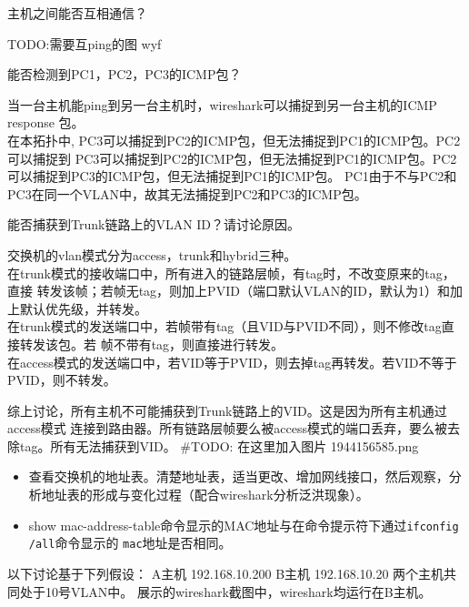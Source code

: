 \documentclass{myreport}
\begin{document}
\begin{tcolorbox}[title = {观察一}]
主机之间能否互相通信？
\end{tcolorbox}
TODO:需要互ping的图
wyf
\begin{tcolorbox}[title = {观察二}]
    能否检测到PC1，PC2，PC3的ICMP包？
\end{tcolorbox}
当一台主机能ping到另一台主机时，wireshark可以捕捉到另一台主机的ICMP response 包。\\ 
在本拓扑中, PC3可以捕捉到PC2的ICMP包，但无法捕捉到PC1的ICMP包。PC2可以捕捉到
PC3可以捕捉到PC2的ICMP包，但无法捕捉到PC1的ICMP包。PC2可以捕捉到PC3的ICMP包，但无法捕捉到PC1的ICMP包。
PC1由于不与PC2和PC3在同一个VLAN中，故其无法捕捉到PC2和PC3的ICMP包。

\begin{tcolorbox}[title = {观察三}]
能否捕获到Trunk链路上的VLAN ID？请讨论原因。
\end{tcolorbox}
交换机的vlan模式分为access，trunk和hybrid三种。\\
在trunk模式的接收端口中，所有进入的链路层帧，有tag时，不改变原来的tag，直接
转发该帧；若帧无tag，则加上PVID（端口默认VLAN的ID，默认为1）和加上默认优先级，并转发。\\
在trunk模式的发送端口中，若帧带有tag（且VID与PVID不同），则不修改tag直接转发该包。若
帧不带有tag，则直接进行转发。\\ 

在access模式的发送端口中，若VID等于PVID，则去掉tag再转发。若VID不等于PVID，则不转发。

综上讨论，所有主机不可能捕获到Trunk链路上的VID。这是因为所有主机通过access模式
连接到路由器。所有链路层帧要么被access模式的端口丢弃，要么被去除tag。所有无法捕获到VID。
#TODO: 在这里加入图片 1944156585.png
\begin{tcolorbox}[title = {观察四}]
    
    \begin{itemize}
        \item 查看交换机的地址表。清楚地址表，适当更改、增加网线接口，然后观察，分析地址表的形成与变化过程（配合wireshark分析泛洪现象）。
        \item show mac-address-table命令显示的MAC地址与在命令提示符下通过\texttt{ifconfig /all}命令显示的 \texttt{mac}地址是否相同。
    \end{itemize}
    
\end{tcolorbox}
以下讨论基于下列假设：
A主机 192.168.10.200
B主机 192.168.10.20
两个主机共同处于10号VLAN中。
展示的wireshark截图中，wireshark均运行在B主机。
\end{document}

